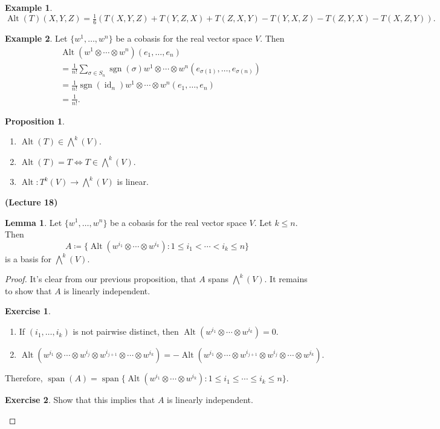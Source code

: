 \documentclass[10pt,letterpaper,cm]{nupset}
\theoremstyle{definition}
\newtheorem{exmp}{Example}
\newtheorem{lemma}{Lemma}
\newtheorem{exercise}{Exercise}
\newtheorem{prop}{Proposition}
\newcommand{\1}{\mathbf{1}}
\newcommand{\0}{\vec 0}
\DeclareMathOperator*{\Span}{span}
\DeclareMathOperator{\id}{id}
\DeclareMathOperator{\Alt}{Alt}
\DeclareMathOperator{\sgn}{sgn}
\begin{document}
\begin{exmp}
$\Alt(T)(X, Y, Z)= \frac{1}{6}(T(X, Y, Z) + T(Y, Z, X) + T(Z, X, Y) -T(Y, X, Z)- T(Z, Y, X) -T(X, Z, Y)).$
\end{exmp}

\begin{exmp}
Let $\{w^1, \ldots, w^n\}$ be a cobasis for the real vector space $V$. Then
\begin{align*}
& \Alt(w^1 \otimes \cdots \otimes w^n)(e_1, \ldots, e_n)\\ & = \frac{1}{n!} \sum_{\sigma \in S_n} \sgn(\sigma)w^1 \otimes \cdots \otimes w^n(e_{\sigma(1)}, \ldots, e_{\sigma(n)}) \\ & =  \frac{1}{n!} \sgn(\id_n) w^1 \otimes \cdots \otimes w^n(e_{1}, \ldots, e_{n}) \\ & = \frac{1}{n!}.
\end{align*}
\end{exmp}

\begin{prop} $ $
\begin{enumerate}
\item $\Alt(T) \in \bigwedge^k(V)$.
\item $\Alt(T) = T \iff T \in \bigwedge^k(V)$.
\item $\Alt : T^k(V) \to \bigwedge^k(V)$ is linear. 
\end{enumerate}
\end{prop}

\begin{center}
{\textbf{(Lecture 18)}} 
\end{center}

\begin{lemma}
Let $\{w^1, \ldots, w^n\}$ be a cobasis for the real vector space $V$. Let $k\leq n$. Then $$A\coloneqq   \{\Alt(w^{i_1} \otimes \cdots \otimes w^{i_k}) : 1 \leq i_1 < \cdots < i_k \leq n \} $$ is a basis for $\bigwedge^k(V)$.
\end{lemma}
\begin{proof}
It's clear from our previous proposition, that $A$ spans $\bigwedge^k(V)$. It remains to show that $A$ is linearly independent. 
\begin{exercise} $ $
\begin{enumerate}
\item If $(i_1, \ldots, i_k)$ is not pairwise distinct, then $\Alt(w^{i_1} \otimes \cdots \otimes w^{i_k}) = 0$.
\item $\Alt(w^{i_1} \otimes \cdots \otimes w^{i_j} \otimes w^{i_{j+1}} \otimes \cdots \otimes w^{i_k}) = -\Alt(w^{i_1} \otimes \cdots \otimes w^{i_{j+1}} \otimes w^{i_{j}} \otimes \cdots \otimes w^{i_k}).$
\end{enumerate}
\end{exercise}
Therefore, $\Span(A) = \Span\{\Alt(w^{i_1} \otimes \cdots \otimes w^{i_k}) : 1 \leq i_1 \leq \cdots \leq i_k \leq n \} $.
\begin{exercise}
Show that this implies that $A$ is linearly independent.
\end{exercise}
\end{proof}
\end{document}
